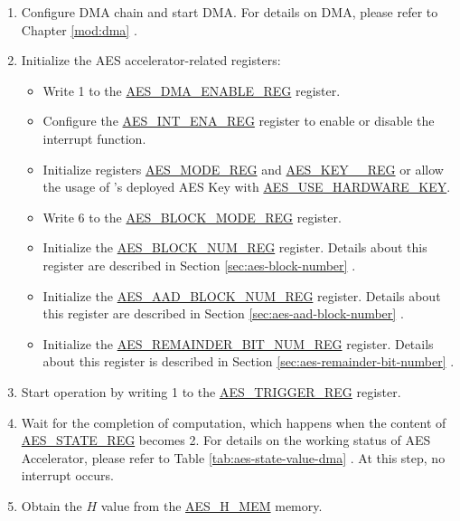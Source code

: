 \documentclass[main\_\_EN.tex]{subfiles}
\begin{document}
\begin{enumerate}
    \item Configure DMA chain and start DMA. For details on DMA, please refer to Chapter \ref{mod:dma} \textit{}.
    \item Initialize the AES accelerator-related registers:
    \begin{itemize}
        \item Write 1 to the \hyperref[regdesc:AESDMAENABLEREG]{AES\_DMA\_ENABLE\_REG} register.
        \item Configure the \hyperref[regdesc:AESINTENAREG]{AES\_INT\_ENA\_REG} register to enable or disable the interrupt function.
        \item Initialize registers \hyperref[regdesc:AESMODEREG]{AES\_MODE\_REG} and \hyperref[regdesc:AESKEYNREG]{AES\_KEY\_\_REG} or allow the usage of 's deployed AES Key with \hyperref[fielddesc:AESUSEHARDWAREKEY]{AES\_USE\_HARDWARE\_KEY}.
        \item Write 6 to the \hyperref[regdesc:AESBLOCKMODEREG]{AES\_BLOCK\_MODE\_REG} register.
        \item Initialize the \hyperref[regdesc:AESBLOCKNUMREG]{AES\_BLOCK\_NUM\_REG} register. Details about this register are described in Section \ref{sec:aes-block-number} \textit{}.
        \item Initialize the \hyperref[regdesc:AESAADBLOCKNUMREG]{AES\_AAD\_BLOCK\_NUM\_REG} register. Details about this register are described in Section \ref{sec:aes-aad-block-number} \textit{}.
        \item Initialize the \hyperref[regdesc:AESREMAINDERBITNUMREG]{AES\_REMAINDER\_BIT\_NUM\_REG} register. Details about this register is described in Section \ref{sec:aes-remainder-bit-number} \textit{}.
    \end{itemize}
    \item Start operation by writing 1 to the \hyperref[regdesc:AESTRIGGERREG]{AES\_TRIGGER\_REG} register.
    \item Wait for the completion of computation, which happens when the content of \hyperref[regdesc:AESSTATEREG]{AES\_STATE\_REG} becomes 2. For details on the working status of AES Accelerator, please refer to Table \ref{tab:aes-state-value-dma} \textit{}. At this step, no interrupt occurs.
    \item Obtain the $H$ value from the \hyperref[memdesc:AESHMEM]{AES\_H\_MEM} memory.

\end{enumerate}
\end{document}
